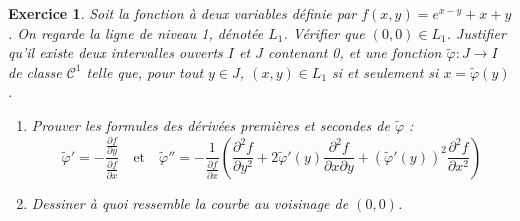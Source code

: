 \documentclass[10pt]{article}
\theoremstyle{frenchstyle}
\newtheorem{exercice}{Exercice}
\begin{document}
\newpage

\begin{exercice}
	Soit la fonction à deux variables définie par \( f(x,y) = e^{x - y} + x + y \). On regarde la ligne de niveau 1, dénotée \( L_1 \). Vérifier que \( (0,0) \in L_1 \). Justifier qu’il existe deux intervalles ouverts \( I \) et \( J \) contenant 0, et une fonction \( \widetilde{\varphi} : J \to I \) de classe \( \mathcal{C}^1 \) telle que, pour tout \( y \in J \),
	\( (x,y) \in L_1 \) si et seulement si \( x = \widetilde{\varphi}(y) \).

	\begin{enumerate}
		\item Prouver les formules des dérivées premières et secondes de \( \widetilde{\varphi} \) :
		      \[
			      \widetilde{\varphi}' = -\frac{\frac{\partial f}{\partial y}}{\frac{\partial f}{\partial x}}
			      \quad \text{et} \quad
			      \widetilde{\varphi}'' = -\frac{1}{\frac{\partial f}{\partial x}}
			      \left( \frac{\partial^2 f}{\partial y^2}
			      + 2 \widetilde{\varphi}'(y) \frac{\partial^2 f}{\partial x \partial y}
			      + \left( \widetilde{\varphi}'(y) \right)^2 \frac{\partial^2 f}{\partial x^2} \right)
		      \]

		\item Dessiner à quoi ressemble la courbe au voisinage de \( (0,0) \).
	\end{enumerate}

\end{exercice}
\end{document}
